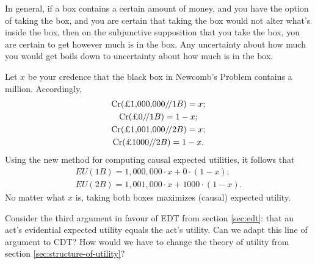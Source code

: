 In general, if a box contains a certain amount of money, and you have
the option of taking the box, and you are certain that taking the box
would not alter what's inside the box, then on the subjunctive
supposition that you take the box, you are certain to get however much
is in the box. Any uncertainty about how much you would get
boils down to uncertainty about how much is in the box.

Let $x$ be your credence that the black box in Newcomb's Problem
contains a million. Accordingly,
\begin{gather*}
  \text{Cr}(\text{£1,000,000}/\!/1B) = x;\\
  \text{Cr}(\text{£0}/\!/1B) = 1-x;\\
  \text{Cr}(\text{£1,001,000}/\!/2B) = x;\\
  \text{Cr}(\text{£1000}/\!/2B) = 1-x.
\end{gather*}
Using the new method for computing causal expected utilities, it follows that
\begin{gather*}
  EU(1B) = 1,000,000 \cdot x + 0 \cdot (1-x);\\
  EU(2B) = 1,001,000 \cdot x + 1000 \cdot (1-x).
\end{gather*}
No matter what $x$ is, taking both boxes maximizes (causal) expected
utility.


\begin{exercise3}
  Consider the third argument in favour of EDT from section
  \ref{sec:edt}: that an act's evidential expected utility equals the
  act's utility. Can we adapt this line of argument to CDT? How would
  we have to change the theory of utility from section
  \ref{sec:structure-of-utility}? 
\end{exercise3}




